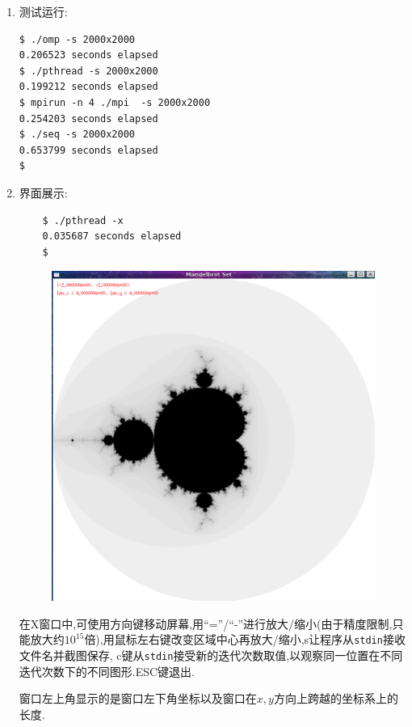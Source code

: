 \begin{enumerate}
\item 测试运行:
\begin{lstlisting}
$ ./omp -s 2000x2000
0.206523 seconds elapsed
$ ./pthread -s 2000x2000
0.199212 seconds elapsed
$ mpirun -n 4 ./mpi  -s 2000x2000
0.254203 seconds elapsed
$ ./seq -s 2000x2000
0.653799 seconds elapsed
$ 
\end{lstlisting}

\item 界面展示:
	\begin{lstlisting}
	$ ./pthread -x
	0.035687 seconds elapsed
	$ 
	\end{lstlisting}

	\begin{figure}[H]
		\centering
		\includegraphics[scale=0.4]{res/show.png}
	\end{figure}

	在X窗口中,可使用方向键移动屏幕,用``=''/``-''进行放大/缩小(由于精度限制,只能放大约$ 10^{15}$倍),用鼠标左右键改变区域中心再放大/缩小,s让程序从\verb|stdin|接收文件名并截图保存,
	c键从\verb|stdin|接受新的迭代次数取值,以观察同一位置在不同迭代次数下的不同图形.ESC键退出.

	窗口左上角显示的是窗口左下角坐标以及窗口在$ x,y$方向上跨越的坐标系上的长度.



\end{enumerate}
